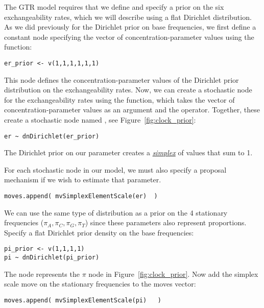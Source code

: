 The GTR model requires that we define and specify a prior on the six exchangeability rates, which we will describe using a flat Dirichlet distribution.
As we did previously for the Dirichlet prior on base frequencies, we first define a constant node specifying the vector of concentration-parameter values using the  function:
{\tt \begin{snugshade*}
\begin{lstlisting}
er_prior <- v(1,1,1,1,1,1) 
\end{lstlisting}
\end{snugshade*}}
This node defines the concentration-parameter values of the Dirichlet prior distribution on the exchangeability rates. 
Now, we can create a stochastic node for the exchangeability rates using the  function, which takes the vector of concentration-parameter values as an argument and the \cl{\rbdn} operator. 
Together, these create a stochastic node named , see Figure~\ref{fig:clock_prior}: 
{\tt \begin{snugshade*}
\begin{lstlisting}
er ~ dnDirichlet(er_prior)
\end{lstlisting}
\end{snugshade*}}
The Dirichlet prior on our parameter  creates a \href{http://en.wikipedia.org/wiki/Simplex}{\textit{simplex}} of values that sum to 1. 


For each stochastic node in our model, we must also specify a proposal mechanism if we wish to estimate that parameter. 
{\tt\small \begin{snugshade*}
\begin{lstlisting}
moves.append( mvSimplexElementScale(er)  )
\end{lstlisting}
\end{snugshade*}}

We can use the same type of distribution as a prior on the 4 stationary frequencies ($\pi_A, \pi_C, \pi_G, \pi_T$) since these parameters also represent proportions. 
Specify a flat Dirichlet prior density on the base frequencies:
{\tt \begin{snugshade*}
\begin{lstlisting}
pi_prior <- v(1,1,1,1) 
pi ~ dnDirichlet(pi_prior)
\end{lstlisting}
\end{snugshade*}}

The node  represents the $\pi$ node in Figure~\ref{fig:clock_prior}.
Now add the simplex scale move on the stationary frequencies to the moves vector:
{\tt \small \begin{snugshade*}
\begin{lstlisting}
moves.append( mvSimplexElementScale(pi)   )
\end{lstlisting}
\end{snugshade*}}

